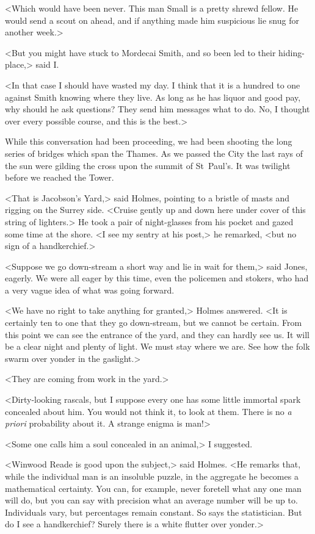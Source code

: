 <Which would have been never. This man Small is a pretty shrewd fellow. He would send a scout on ahead, and if anything made him suspicious lie snug for another week.>

<But you might have stuck to Mordecai Smith, and so been led to their hiding-place,> said I\@.

<In that case I should have wasted my day. I think that it is a hundred to one against Smith knowing where they live. As long as he has liquor and good pay, why should he ask questions? They send him messages what to do. No, I thought over every possible course, and this is the best.>

While this conversation had been proceeding, we had been shooting the long series of bridges which span the Thames. As we passed the City the last rays of the sun were gilding the cross upon the summit of St~Paul's. It was twilight before we reached the Tower.

<That is Jacobson's Yard,> said Holmes, pointing to a bristle of masts and rigging on the Surrey side. <Cruise gently up and down here under cover of this string of lighters.> He took a pair of night-glasses from his pocket and gazed some time at the shore. <I see my sentry at his post,> he remarked, <but no sign of a handkerchief.>

<Suppose we go down-stream a short way and lie in wait for them,> said Jones, eagerly. We were all eager by this time, even the policemen and stokers, who had a very vague idea of what was going forward.

<We have no right to take anything for granted,> Holmes answered. <It is certainly ten to one that they go down-stream, but we cannot be certain. From this point we can see the entrance of the yard, and they can hardly see us. It will be a clear night and plenty of light. We must stay where we are. See how the folk swarm over yonder in the gaslight.>

<They are coming from work in the yard.>

<Dirty-looking rascals, but I suppose every one has some little immortal spark concealed about him. You would not think it, to look at them. There is no \textit{a priori} probability about it. A strange enigma is man!>

<Some one calls him a soul concealed in an animal,> I suggested.

<Winwood Reade is good upon the subject,> said Holmes. <He remarks that, while the individual man is an insoluble puzzle, in the aggregate he becomes a mathematical certainty. You can, for example, never foretell what any one man will do, but you can say with precision what an average number will be up to. Individuals vary, but percentages remain constant. So says the statistician. But do I see a handkerchief? Surely there is a white flutter over yonder.>


